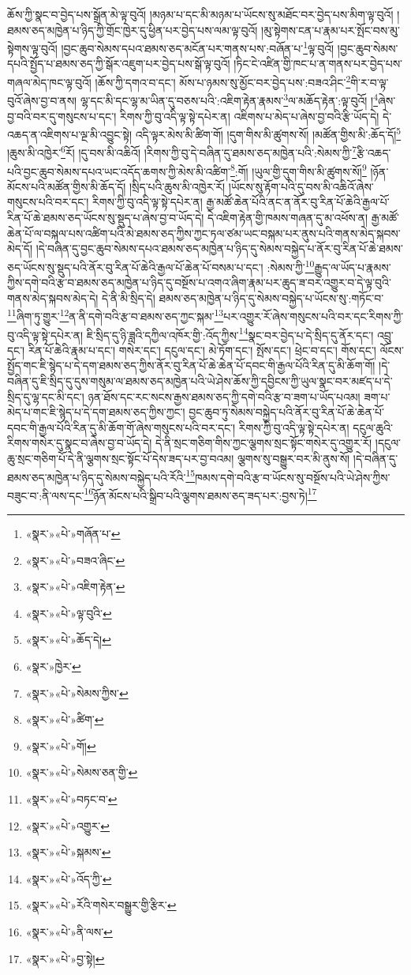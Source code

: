 ཆོས་ཀྱི་སྣང་བ་བྱེད་པས་སྒྲོན་མེ་ལྟ་བུའོ། །མཉམ་པ་དང་མི་མཉམ་པ་ཡོངས་སུ་མཐོང་བར་བྱེད་པས་མིག་ལྟ་བུའོ། །ཐམས་ཅད་མཁྱེན་པ་ཉིད་ཀྱི་གྲོང་ཁྱེར་དུ་ཕྱིན་པར་བྱེད་པས་ལམ་ལྟ་བུའོ། །མུ་སྟེགས་ངན་པ་རྣམ་པར་སྤོང་བས་མུ་སྟེགས་ལྟ་བུའོ། །བྱང་ཆུབ་སེམས་དཔའ་ཐམས་ཅད་མངོན་པར་གནས་པས་:བཞོན་པ་\footnote{«སྣར་»«པེ་»གཞོན་པ་}ལྟ་བུའོ། །བྱང་ཆུབ་སེམས་དཔའི་སྤྱོད་པ་ཐམས་ཅད་ཀྱི་སྒོར་འཇུག་པར་བྱེད་པས་སྒོ་ལྟ་བུའོ། །ཏིང་ངེ་འཛིན་གྱི་ཁང་པ་ན་གནས་པར་བྱེད་པས་གཞལ་མེད་ཁང་ལྟ་བུའོ། །ཆོས་ཀྱི་དགའ་བ་དང་། མོས་པ་ཉམས་སུ་མྱོང་བར་བྱེད་པས་:བཟའ་ཤིང་\footnote{«སྣར་»«པེ་»བཟའ་ཞིང་}གི་ར་བ་ལྟ་བུའོ་ཞེས་བྱ་བ་ནས། ལྷ་དང་མི་དང་ལྷ་མ་ཡིན་དུ་བཅས་པའི་:འཇིག་རྟེན་རྣམས་\footnote{«སྣར་»«པེ་»འཇིག་རྟེན་}ལ་མཆོད་རྟེན་:ལྟ་བུའོ། །\footnote{«སྣར་»«པེ་»ལྟ་བུའི་}ཞེས་བྱ་བའི་བར་དུ་གསུངས་པ་དང་། རིགས་ཀྱི་བུ་འདི་ལྟ་སྟེ་དཔེར་ན། འཇིགས་པ་མེད་པ་ཞེས་བྱ་བའི་རྩི་ཡོད་དེ། དེ་འཆད་ན་འཇིགས་པ་ལྔ་མི་འབྱུང་སྟེ། འདི་ལྟར་མེས་མི་ཚིག་གོ། །དུག་གིས་མི་ཚུགས་སོ། །མཚོན་གྱིས་མི་:ཆོད་དོ།\footnote{«སྣར་»«པེ་»ཆོད་དེ།} །ཆུས་མི་འཁྱེར་\footnote{«སྣར་»ཁྱེར་}རོ། །དུ་བས་མི་འཆིའོ། །རིགས་ཀྱི་བུ་དེ་བཞིན་དུ་ཐམས་ཅད་མཁྱེན་པའི་:སེམས་ཀྱི་\footnote{«སྣར་»«པེ་»སེམས་ཀྱིས་}རྩི་འཆད་པའི་བྱང་ཆུབ་སེམས་དཔའ་ཡང་འདོད་ཆགས་ཀྱི་མེས་མི་འཚིག་\footnote{«སྣར་»«པེ་»ཚིག་}:གོ། །ཡུལ་གྱི་དུག་གིས་མི་ཚུགས་སོ།\footnote{«སྣར་»«པེ་»གོ།} །ཉོན་མོངས་པའི་མཚོན་གྱིས་མི་ཆོད་དོ། །སྲིད་པའི་ཆུས་མི་འཁྱེར་རོ། །ཡོངས་སུ་རྟོག་པའི་དུ་བས་མི་འཆིའོ་ཞེས་གསུངས་པའི་བར་དང་། རིགས་ཀྱི་བུ་འདི་ལྟ་སྟེ་དཔེར་ན། རྒྱ་མཚོ་ཆེན་པོའི་ནང་ན་ནོར་བུ་རིན་པོ་ཆེའི་རྒྱལ་པོ་རིན་པོ་ཆེ་ཐམས་ཅད་ཡོངས་སུ་སྡུད་པ་ཞེས་བྱ་བ་ཡོད་དེ། དེ་འཇིག་རྟེན་གྱི་ཁམས་གཞན་དུ་མ་འཕོས་ན། རྒྱ་མཚོ་ཆེན་པོ་ལ་བསྐལ་པས་འཚིག་པའི་མེ་ཐམས་ཅད་ཀྱིས་ཀྱང་ཏལ་ཙམ་ཡང་བསྐམ་པར་ནུས་པའི་གནས་མེད་སྐབས་མེད་དོ། །དེ་བཞིན་དུ་བྱང་ཆུབ་སེམས་དཔའ་ཐམས་ཅད་མཁྱེན་པ་ཉིད་དུ་སེམས་བསྐྱེད་པ་ནོར་བུ་རིན་པོ་ཆེ་ཐམས་ཅད་ཡོངས་སུ་སྡུད་པའི་ནོར་བུ་རིན་པོ་ཆེའི་རྒྱལ་པོ་ཆེན་པོ་བསམ་པ་དང་། :སེམས་ཀྱི་\footnote{«སྣར་»«པེ་»སེམས་ཅན་གྱི་}རྒྱུད་ལ་ཡོད་པ་རྣམས་ཀྱིས་དགེ་བའི་རྩ་བ་ཐམས་ཅད་མཁྱེན་པ་ཉིད་དུ་བསྔོས་པ་འགའ་ཞིག་རྣམ་པར་ཆུད་ཟ་བར་འགྱུར་བ་དེ་ལྟ་བུའི་གནས་མེད་སྐབས་མེད་དེ། དེ་ནི་མི་སྲིད་དེ། ཐམས་ཅད་མཁྱེན་པ་ཉིད་དུ་སེམས་བསྐྱེད་པ་ཡོངས་སུ་:གཏོང་བ་\footnote{«སྣར་»«པེ་»བཏང་བ་}ཞིག་ཏུ་གྱུར་\footnote{«སྣར་»«པེ་»འགྱུར་}ན་ནི་དགེ་བའི་རྩ་བ་ཐམས་ཅད་ཀྱང་སྐམ་\footnote{«སྣར་»«པེ་»སྐམས་}པར་འགྱུར་རོ་ཞེས་གསུངས་པའི་བར་དང་རིགས་ཀྱི་བུ་འདི་ལྟ་སྟེ་དཔེར་ན། ཇི་སྲིད་དུ་ཉི་ཟླའི་དཀྱིལ་འཁོར་གྱི་:འོད་ཀྱིས་\footnote{«སྣར་»«པེ་»འོད་ཀྱི་}སྣང་བར་བྱེད་པ་དེ་སྲིད་དུ་ནོར་དང་། འབྲུ་དང་། རིན་པོ་ཆེའི་རྣམ་པ་དང་། གསེར་དང་། དངུལ་དང་། མེ་ཏོག་དང་། སྤོས་དང་། ཕྲེང་བ་དང་། གོས་དང་། ལོངས་སྤྱོད་གང་ཇི་སྙེད་པ་དེ་དག་ཐམས་ཅད་ཀྱིས་ནོར་བུ་རིན་པོ་ཆེ་ཆེན་པོ་དབང་གི་རྒྱལ་པོའི་རིན་དུ་མི་ཆོག་གོ། །དེ་བཞིན་དུ་ཇི་སྲིད་དུ་དུས་གསུམ་ལ་ཐམས་ཅད་མཁྱེན་པའི་ཡེ་ཤེས་ཆོས་ཀྱི་དབྱིངས་ཀྱི་ཡུལ་སྣང་བར་མཛད་པ་དེ་སྲིད་དུ་ལྷ་དང་མི་དང་། ཉན་ཐོས་དང་རང་སངས་རྒྱས་ཐམས་ཅད་ཀྱི་དགེ་བའི་རྩ་བ་ཟག་པ་ཡོད་པའམ། ཟག་པ་མེད་པ་གང་ཇི་སྙེད་པ་དེ་དག་ཐམས་ཅད་ཀྱིས་ཀྱང་། བྱང་ཆུབ་ཏུ་སེམས་བསྐྱེད་པའི་ནོར་བུ་རིན་པོ་ཆེ་ཆེན་པོ་དབང་གི་རྒྱལ་པོའི་རིན་དུ་མི་ཆོག་གོ་ཞེས་གསུངས་པའི་བར་དང་། རིགས་ཀྱི་བུ་འདི་ལྟ་སྟེ་དཔེར་ན། དངུལ་ཆུའི་རིགས་གསེར་དུ་སྣང་བ་ཞེས་བྱ་བ་ཡོད་དེ། དེ་ནི་སྲང་གཅིག་གིས་ཀྱང་ལྕགས་སྲང་སྟོང་གསེར་དུ་འགྱུར་རོ། །དངུལ་ཆུ་སྲང་གཅིག་པོ་དེ་ནི་ལྕགས་སྲང་སྟོང་པོ་དེས་ཟད་པར་བྱ་བའམ། ལྕགས་སུ་བསྒྱུར་བར་མི་ནུས་སོ། །དེ་བཞིན་དུ་ཐམས་ཅད་མཁྱེན་པ་ཉིད་དུ་སེམས་བསྐྱེད་པའི་རོའི་\footnote{«སྣར་»«པེ་»རོའི་གསེར་བསྒྱུར་གྱི་རྩིར་}ཁམས་དགེ་བའི་རྩ་བ་ཡོངས་སུ་བསྔོས་པའི་ཡེ་ཤེས་ཀྱིས་བཟུང་བ་:ནི་ལས་དང་\footnote{«སྣར་»«པེ་»ནི་ལས་}ཉོན་མོངས་པའི་སྒྲིབ་པའི་ལྕགས་ཐམས་ཅད་ཟད་པར་:བྱས་ཏེ།\footnote{«སྣར་»«པེ་»བྱ་སྟེ།} 